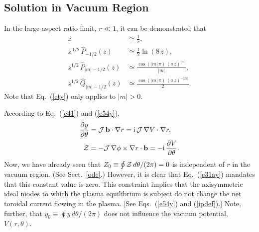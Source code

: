 \documentclass[12pt,prb,aps]{revtex4-1}
\begin{document}
\subsection{Solution in Vacuum Region}
In the large-aspect ratio limit, $r\ll 1$, it can be demonstrated that\,\cite{mf2}
\begin{align}
z&\simeq \frac{1}{r},\label{e25t}\\[0.5ex]
z^{\,1/2}\,\hat{P}_{-1/2}(z) &\simeq \frac{1}{2}\ln(8\,z),\\[0.5ex]
z^{1/2}\,\hat{P}_{|m|-1/2}(z) &\simeq \frac{\cos(|m|\,\pi)\,(a\,z)^{|m|}}{|m|},\label{ety}\\[0.5ex]
z^{1/2}\,\hat{Q}_{|m|-1/2}(z) &\simeq \frac{\cos(|m|\,\pi)\,(a\,z)^{-|m|}}{2}.\label{e29t}
\end{align}
Note that Eq.~(\ref{ety}) only applies to $|m|>0$.

According to Eq.~(\ref{e41}) and (\ref{e54y}),
\begin{align}\label{e30ay}
\frac{\partial y}{\partial \theta}&= {\cal J}\,{\bf b}\cdot\nabla r = {\rm i}\,{\cal J}\,\nabla V\cdot\nabla r,\\[0.5ex]
{\cal Z}&= -{\cal J}\,\nabla\phi\times\nabla r \cdot{\bf b} = - {\rm i}\,\frac{\partial V}{\partial\theta}.\label{e31ay}
\end{align}
Now, we have already seen that $Z_0\equiv \oint{\cal Z}\,d\theta/(2\pi)=0$ is independent of $r$ in the vacuum region.  (See Sect.~\ref{ode}.) 
However, it is clear that Eq.~(\ref{e31ay}) mandates that this constant value is zero. This constraint implies that the axisymmetric ideal modes to
which the plasma equilibrium is subject do not change the net toroidal current flowing in the plasma. [See Eqs.~(\ref{e54y}) and (\ref{ipdef}).]  Note, further, that $y_0\equiv \oint y\,d\theta/(2\pi)$ does
not influence the vacuum potential, $V(r,\theta)$. 
\end{document}
